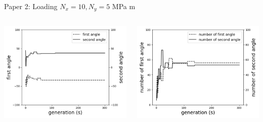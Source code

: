 \documentclass{beamer}
\begin{document}
\begin{frame}{Paper 2: Loading $N_x = 10, N_y=5 $ MPa m}
\begin{columns}
\begin{column}{0.5\textwidth}
        \begin{center}
			\includegraphics[width=1.0\linewidth]{./fig/two_distinct_angle_angle_change.png}
        \end{center}
    \end{column}
    \begin{column}{0.5\textwidth}
        \begin{center}
			\includegraphics[width=1.0\linewidth]{./fig/two_distinct_angler_number_change.png}
        \end{center}
    \end{column}
\end{columns}
\end{frame}
\end{document}
